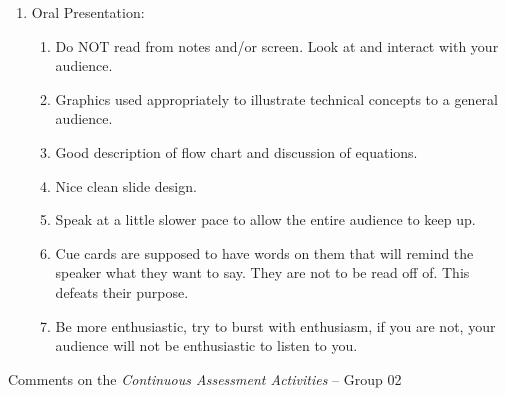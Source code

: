 \documentclass[14pt,twoside]{report}
\begin{document}
\begin{enumerate}
\item Oral Presentation:
\begin{enumerate}
%
\item Do NOT read from notes and/or screen. Look at and interact with your audience.
%
\item Graphics used appropriately to illustrate technical concepts to a general audience.
%
\item Good description of flow chart and discussion of equations.
%
\item Nice clean slide design.
%
\item Speak at a little slower pace to allow the entire audience to keep up.
%
\item Cue cards are supposed to have words on them that will remind the speaker what they want to say. They are not to be read off of. This defeats their purpose.
%
\item Be more enthusiastic, try to burst with enthusiasm, if you are not, your audience will not be enthusiastic to listen to you.
%
\end{enumerate}

\end{enumerate}


\clearpage



\bigskip

\begin{center}
  {\Large Comments on the {\it Continuous Assessment Activities} -- Group 02}
\end{center}
\end{document}
